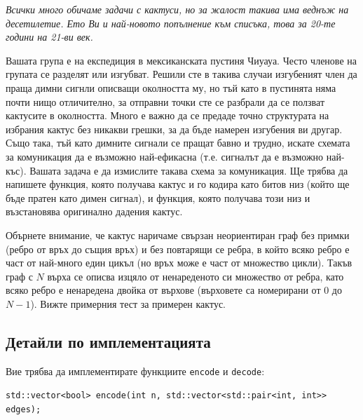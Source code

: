 \documentclass[12pt]{article}
\begin{document}
\renewcommand{\tl}{$0.75$ сек.}
\renewcommand{\ml}{$256$ MB}


\renewcommand{\header}{
    XLI НАЦИОНАЛНА ОЛИМПИАДА ПО ИНФОРМАТИКА\\
    Национален кръг\\
    Велико Търново, 7 - 10 март 2025 г.\\
    Група AB, 9-12 клас, Ден 2
}

\vspace{0.1in}

\textit{Всички много обичаме задачи с кактуси, но за жалост такива има веднъж на десетилетие. Ето Ви и най-новото попълнение към списъка, това за 20-те години на 21-ви век.}

Вашата група е на експедиция в мексиканската пустиня Чиуауа. Често членове на групата се разделят или изгубват. Решили сте в такива случаи изгубеният член да праща димни сигнли описващи околността му, но тъй като в пустинята няма почти нищо отличително, за отправни точки сте се разбрали да се ползват кактусите в околността. Много е важно да се предаде точно структурата на избрания кактус без никакви грешки, за да бъде намерен изгубения ви другар. Също така, тъй като димните сигнали се пращат бавно и трудно, искате схемата за комуникация да е възможно най-ефикасна (т.е. сигналът да е възможно най-къс). Вашата задача е да измислите такава схема за комуникация. Ще трябва да напишете функция, която получава кактус и го кодира като битов низ (който ще бъде пратен като димен сигнал), и функция, която получава този низ и възстановява оригинално дадения кактус.

Обърнете внимание, че кактус наричаме свързан неориентиран граф без примки (ребро от връх до същия връх) и без повтарящи се ребра, в който всяко ребро е част от най-много един цикъл (но връх може е част от множество цикли). Такъв граф с $N$ върха се описва изцяло от ненареденото си множество от ребра, като всяко ребро е ненаредена двойка от върхове (върховете са номерирани от $0$ до $N-1$). Вижте примерния тест за примерен кактус.

\subsection{Детайли по имплементацията}

Вие трябва да имплементирате функциите \verb|encode| и \verb|decode|:

{\footnotesize \verb|std::vector<bool> encode(int n, std::vector<std::pair<int, int>> edges);|}
\end{document}
